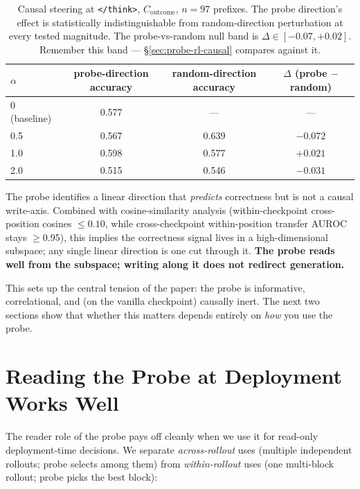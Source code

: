 \documentclass[11pt]{article}
\begin{document}
\begin{table}[h]
\centering
\small
\begin{tabular}{lccc}
\toprule
$\alpha$ & probe-direction accuracy & random-direction accuracy & $\Delta$ (probe $-$ random) \\
\midrule
0 (baseline) & 0.577 & --- & --- \\
0.5 & 0.567 & 0.639 & $-0.072$ \\
1.0 & 0.598 & 0.577 & $+0.021$ \\
2.0 & 0.515 & 0.546 & $-0.031$ \\
\bottomrule
\end{tabular}
\caption{Causal steering at \texttt{</think>}, $C_{\text{outcome}}$, $n{=}97$ prefixes. The probe direction's effect is statistically indistinguishable from random-direction perturbation at every tested magnitude. The probe-vs-random null band is $\Delta \in [-0.07, +0.02]$. Remember this band --- §\ref{sec:probe-rl-causal} compares against it.}
\end{table}

The probe identifies a linear direction that \emph{predicts} correctness but is not a causal write-axis. Combined with cosine-similarity analysis (within-checkpoint cross-position cosines $\leq 0.10$, while cross-checkpoint within-position transfer AUROC stays $\geq 0.95$), this implies the correctness signal lives in a high-dimensional subspace; any single linear direction is one cut through it. \textbf{The probe reads well from the subspace; writing along it does not redirect generation.}

This sets up the central tension of the paper: the probe is informative, correlational, and (on the vanilla checkpoint) causally inert. The next two sections show that whether this matters depends entirely on \emph{how} you use the probe.

\section{Reading the Probe at Deployment Works Well}\label{sec:deployment}

The reader role of the probe pays off cleanly when we use it for read-only deployment-time decisions. We separate \emph{across-rollout} uses (multiple independent rollouts; probe selects among them) from \emph{within-rollout} uses (one multi-block rollout; probe picks the best block):
\end{document}

